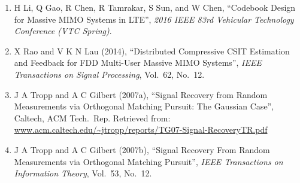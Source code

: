 \documentclass[12pt]{article}
\begin{document}
\begin{enumerate}
\item H Li, Q Gao, R Chen, R Tamrakar, S Sun, and W Chen, ``Codebook Design for Massive MIMO Systems in LTE'', \textit{2016 IEEE 83rd Vehicular Technology Conference (VTC Spring)}.

\item X Rao and V K N Lau (2014), ``Distributed Compressive CSIT Estimation and Feedback for FDD Multi-User Massive MIMO Systems'', \textit{IEEE Transactions on Signal Processing}, Vol.\ 62, No.\ 12.

\item J A Tropp and A C Gilbert (2007a), ``Signal Recovery from Random Measurements via Orthogonal Matching Pursuit: The Gaussian Case'', Caltech, ACM Tech.\ Rep. Retrieved from: \url{www.acm.caltech.edu/~jtropp/reports/TG07-Signal-RecoveryTR.pdf}

\item J A Tropp and A C Gilbert (2007b), ``Signal Recovery From Random Measurements via Orthogonal Matching Pursuit'', \textit{IEEE Transactions on Information Theory}, Vol.\ 53, No.\ 12.


\end{enumerate}
\end{document}
